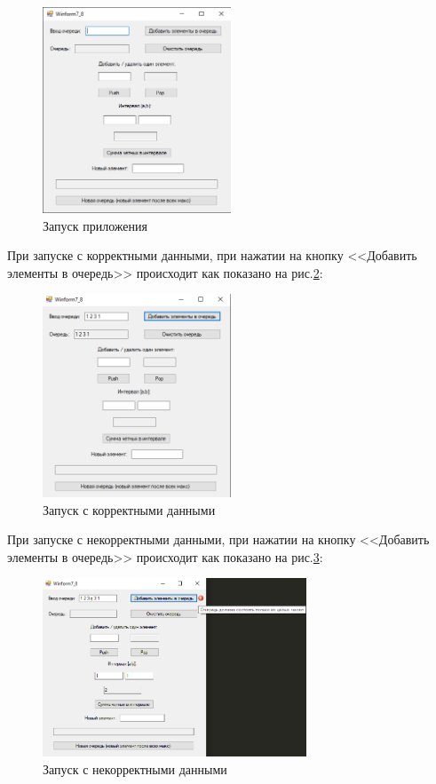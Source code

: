 \begin{figure}[!h]
    \centering
    \includegraphics[width = 0.5\textwidth]{images/Task7/Start.png}
    \caption{Запуск приложения}
    \label{fig:StartForm7}
\end{figure}

При запуске с корректными данными, при нажатии на кнопку <<Добавить элементы в очередь>> происходит как показано на рис.\ref{fig:WorkForm7}:

\newpage

\begin{figure}[!h]
    \centering
    \includegraphics[width = 0.5\textwidth]{images/Task7/WorkAddQueue.png}
    \caption{Запуск с корректными данными}
    \label{fig:WorkForm7}
\end{figure}

При запуске с некорректными данными, при нажатии на кнопку <<Добавить элементы в очередь>> происходит  как показано на рис.\ref{fig:BadInputNotIntForm7}:

\begin{figure}[!h]
    \centering
    \includegraphics[width = 0.7\textwidth]{images/Task7/BadInputAddNotInt.png}
    \caption{Запуск с некорректными данными}
    \label{fig:BadInputNotIntForm7}
\end{figure}


